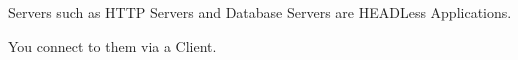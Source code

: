 Servers such as HTTP Servers and Database Servers are HEADLess Applications.

You connect to them via a Client.